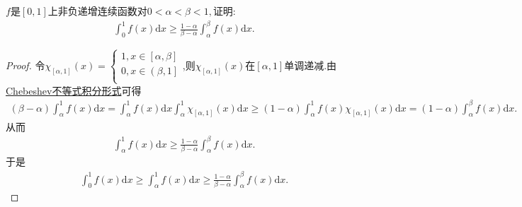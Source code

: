 \documentclass[lang=cn,newtx,10pt,scheme=chinese]{../Template/elegantbook}
\begin{document}
\begin{example}
$f$是$[0,1]$上非负递增连续函数对$0 < \alpha < \beta < 1,$证明:
\begin{gather}
\int_{0}^{1} f(x) \mathrm{d}x \geqslant  \frac{1 - \alpha}{\beta - \alpha} \int_{\alpha}^{\beta} f(x) \mathrm{d}x.
\nonumber
\end{gather}
\end{example}
\begin{proof}
令$\chi _{\left[ \alpha ,1 \right]}\left( x \right) =\begin{cases}
1,x\in \left[ \alpha ,\beta \right]\\
0,x\in \left( \beta ,1 \right]\\
\end{cases}$,则$\chi _{\left[ \alpha ,1 \right]}\left( x \right)$在$[\alpha,1]$单调递减.由\hyperref[Basis of Analytics-Chebeshev不等式积分形式]{Chebeshev不等式积分形式}可得
\begin{align*}
\left( \beta -\alpha \right) \int_{\alpha}^1{f(x)\mathrm{d}x}=\int_{\alpha}^1{f(x)\mathrm{d}x\int_{\alpha}^1{\chi _{\left[ \alpha ,1 \right]}\left( x \right) \mathrm{d}x}}\geqslant \left( 1-\alpha \right) \int_{\alpha}^1{f\left( x \right) \chi _{\left[ \alpha ,1 \right]}\left( x \right) \mathrm{d}x}=\left( 1-\alpha \right) \int_{\alpha}^{\beta}{f\left( x \right) \mathrm{d}x}.
\nonumber
\end{align*}
从而
\begin{align*}
\int_{\alpha}^1{f(x)\mathrm{d}x}\geqslant \frac{1-\alpha}{\beta -\alpha}\int_{\alpha}^{\beta}{f\left( x \right) \mathrm{d}x}.
\nonumber
\end{align*}
于是
\begin{align*}
\int_0^1{f(x)\mathrm{d}x}\geqslant \int_{\alpha}^1{f(x)\mathrm{d}x}\geqslant \frac{1-\alpha}{\beta -\alpha}\int_{\alpha}^{\beta}{f\left( x \right) \mathrm{d}x}.
\nonumber
\end{align*}

\end{proof}
\end{document}
